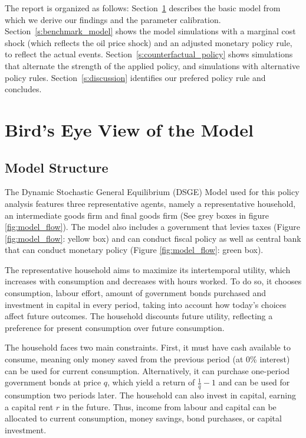 \documentclass[12pt]{article}
\begin{document}
The report is organized as follows: Section~\ref{s:model_description} describes the basic model from which we derive our findings and the parameter calibration. Section~\ref{s:benchmark_model} shows the model simulations with a marginal cost shock (which reflects the oil price shock) and an adjusted monetary policy rule, to reflect the actual events. Section~\ref{s:counterfactual_policy} shows simulations that alternate the strength of the applied policy, and simulations with alternative policy rules. Section~\ref{s:discussion} identifies our prefered policy rule and concludes. 

\newpage
\section{Bird’s Eye View of the Model}\label{s:model_description}


\subsection*{Model Structure}
The Dynamic Stochastic General Equilibrium (DSGE) Model used for this policy analysis features
three representative agents, namely a representative household, an intermediate goods firm and final goods firm (See grey boxes in figure \ref{fig:model_flow}). The model also includes a government that levies taxes (Figure \ref{fig:model_flow}: yellow box) and can conduct fiscal policy as well as central bank that can conduct monetary policy (Figure \ref{fig:model_flow}: green box).

The representative household aims to maximize its intertemporal utility, which increases with consumption and decreases with hours worked. To do so, it chooses consumption, labour effort, amount of government bonds purchased and investment in capital in every period, taking into account how today's choices affect future outcomes. The household discounts future utility, reflecting a preference for present consumption over future consumption.

The household faces two main constraints. First, it must have cash available to consume, meaning only money saved from the previous period (at 0\% interest) can be used for current consumption. Alternatively, it can purchase one-period government bonds at price $q$, which yield a return of $\frac{1}{q} - 1$ and can be used for consumption two periods later. The household can also invest in capital, earning a capital rent $r$ in the future. Thus, income from labour and capital can be allocated to current consumption, money savings, bond purchases, or capital investment.
\end{document}
